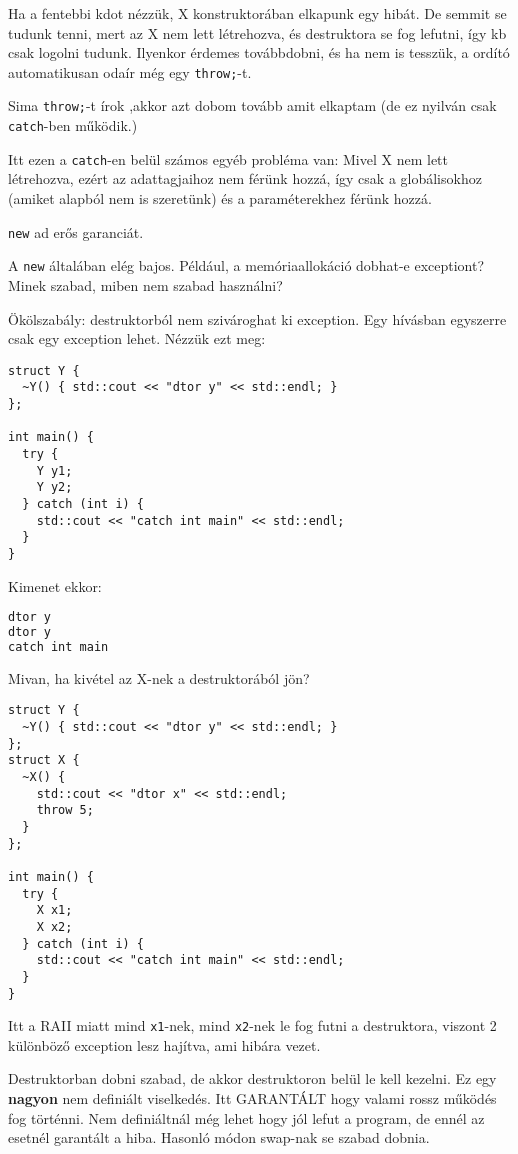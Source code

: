 \documentclass[a4paper,11.5pt]{article}
\begin{document}
		Ha a fentebbi kdot nézzük, X konstruktorában elkapunk egy hibát. De semmit se tudunk tenni, mert az X nem lett létrehozva, és destruktora se fog lefutni, így kb csak logolni tudunk. Ilyenkor érdemes továbbdobni, és ha nem is tesszük, a ordító automatikusan odaír még egy \texttt{throw;}-t.
		
		Sima \texttt{throw;}-t írok ,akkor azt dobom tovább amit elkaptam (de ez nyilván csak \texttt{catch}-ben működik.)
		
		Itt ezen a \texttt{catch}-en belül számos egyéb probléma van: Mivel X nem lett létrehozva, ezért az adattagjaihoz nem férünk hozzá, így csak a globálisokhoz (amiket alapból nem is szeretünk) és a paraméterekhez férünk hozzá.
		
		\texttt{new} ad erős garanciát.
		
		A \texttt{new} általában elég bajos. Például, a memóriaallokáció dobhat-e exceptiont? Minek szabad, miben nem szabad használni? 
		
		Ökölszabály: destruktorból nem szivároghat ki exception. Egy hívásban egyszerre csak egy exception lehet. Nézzük ezt meg:
		
		
		\begin{lstlisting}
struct Y {
  ~Y() { std::cout << "dtor y" << std::endl; }
};

int main() {
  try {
    Y y1;
    Y y2;
  } catch (int i) {
    std::cout << "catch int main" << std::endl;
  }
}
		\end{lstlisting}
		Kimenet ekkor:
		\begin{lstlisting}[language=bash]
dtor y
dtor y
catch int main
		\end{lstlisting}
		Mivan, ha kivétel az X-nek a destruktorából jön?
		\begin{lstlisting}
struct Y {
  ~Y() { std::cout << "dtor y" << std::endl; }
};
struct X {
  ~X() {
    std::cout << "dtor x" << std::endl;
    throw 5;
  }
};

int main() {
  try {
    X x1;
    X x2;
  } catch (int i) {
    std::cout << "catch int main" << std::endl;
  }
}
		\end{lstlisting}
		Itt a RAII miatt mind \texttt{x1}-nek, mind \texttt{x2}-nek le fog futni a destruktora, viszont 2 különböző exception lesz hajítva, ami hibára vezet.
		
		Destruktorban dobni szabad, de akkor destruktoron belül le kell kezelni. Ez egy \textbf{nagyon} nem definiált viselkedés. Itt GARANTÁLT hogy valami rossz működés fog történni. Nem definiáltnál még lehet hogy jól lefut a program, de ennél az esetnél garantált a hiba. Hasonló módon swap-nak se szabad dobnia.
		
\end{document}

